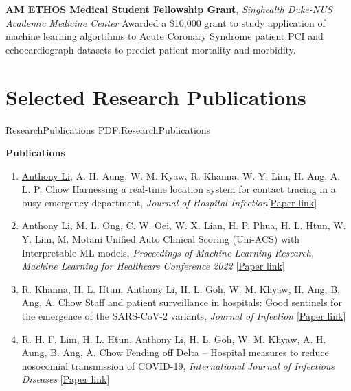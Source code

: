 \documentclass[letterpaper,10pt,oneside]{article}
\begin{document}
\begin{body}
\textbf{AM ETHOS Medical Student Fellowship Grant},
\hfill{}
\GapNoBreak
\textit{Singhealth Duke-NUS Academic Medicine Center}
\GapNoBreak
\BulletItem
Awarded a \$10,000 grant to study application of machine learning algortihms to Acute Coronary Syndrome patient PCI and echocardiograph datasets to predict patient mortality and morbidity.
\GapNoBreak

\section
{Selected Research Publications}
{ResearchPublications}
{PDF:ResearchPublications}

\textbf{Publications}
\GapNoBreak
{}

\begin{enumerate}
\item \underline{Anthony Li}, A. H. Aung, W. M. Kyaw, R. Khanna, W. Y. Lim, H. Ang, A. L. P. Chow \textcolor{mygray}{Harnessing a real-time location system for contact tracing in a busy emergency department}, \textit{Journal of Hospital Infection}[\href{https://www.journalofhospitalinfection.com/article/S0195-6701(23)00279-7/fulltext}{Paper link}]

\item \underline{Anthony Li}, M. L. Ong, C. W. Oei, W. X. Lian, H. P. Phua, H. L. Htun, W. Y. Lim, M. Motani \textcolor{mygray}{Unified Auto Clinical Scoring (Uni-ACS) with Interpretable ML models}, \textit{Proceedings of Machine Learning Research, Machine Learning for Healthcare Conference 2022 }[\href{https://static1.squarespace.com/static/59d5ac1780bd5ef9c396eda6/t/62e975060329a7015f4f6eab/1659467015391/15+MLHC2022_Uni_ACS_Camera_Ready.pdf}{Paper link}]


\item R. Khanna, H. L. Htun, \underline{Anthony Li}, H. L. Goh, W. M. Khyaw, H. Ang, B. Ang, A. Chow \textcolor{mygray}{Staff and patient surveillance in hospitals: Good sentinels for the emergence of the SARS-CoV-2 variants}, \textit{Journal of Infection }[\href{https://www.journalofinfection.com/article/S0163-4453(22)00411-X/fulltext}{Paper link}]


\item R. H. F. Lim, H. L. Htun, \underline{Anthony Li}, H. L. Goh, W. M. Khyaw, A. H. Aung, B. Ang, A. Chow \textcolor{mygray}{Fending off Delta – Hospital measures to reduce nosocomial transmission of COVID-19}, \textit{International Journal of Infectious Diseases }[\href{https://www.ijidonline.com/article/S1201-9712(22)00077-7/fulltext}{Paper link}]



\end{enumerate}
\end{body}
\end{document}
